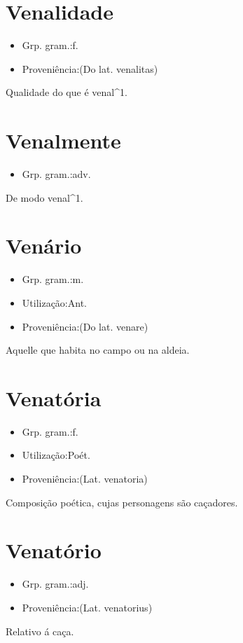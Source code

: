 \documentclass{article}
\begin{document}
\section{Venalidade}
\begin{itemize}
\item {Grp. gram.:f.}
\end{itemize}
\begin{itemize}
\item {Proveniência:(Do lat. \textunderscore venalitas\textunderscore )}
\end{itemize}
Qualidade do que é venal^1.
\section{Venalmente}
\begin{itemize}
\item {Grp. gram.:adv.}
\end{itemize}
De modo venal^1.
\section{Venário}
\begin{itemize}
\item {Grp. gram.:m.}
\end{itemize}
\begin{itemize}
\item {Utilização:Ant.}
\end{itemize}
\begin{itemize}
\item {Proveniência:(Do lat. \textunderscore venare\textunderscore )}
\end{itemize}
Aquelle que habita no campo ou na aldeia.
\section{Venatória}
\begin{itemize}
\item {Grp. gram.:f.}
\end{itemize}
\begin{itemize}
\item {Utilização:Poét.}
\end{itemize}
\begin{itemize}
\item {Proveniência:(Lat. \textunderscore venatoria\textunderscore )}
\end{itemize}
Composição poética, cujas personagens são caçadores.
\section{Venatório}
\begin{itemize}
\item {Grp. gram.:adj.}
\end{itemize}
\begin{itemize}
\item {Proveniência:(Lat. \textunderscore venatorius\textunderscore )}
\end{itemize}
Relativo á caça.
\end{document}
